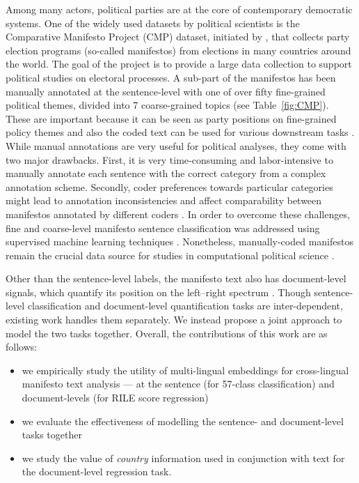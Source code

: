 \documentclass[11pt,a4paper]{article}
\newcommand{\tabref}[2][]{Table#1~\ref{#2}\xspace}
\begin{document}
Among many actors, political parties are at the core of contemporary democratic systems. One of the widely used datasets by political scientists is the Comparative
Manifesto Project (CMP) dataset, initiated by , that collects party election programs (so-called manifestos) from elections in many countries around the world. The goal of the project is to provide a large data collection to support political studies on electoral processes. A sub-part of the manifestos has been manually annotated at the sentence-level with one of over fifty fine-grained political themes, divided into 7 coarse-grained topics (see \tabref{fig:CMP}). These are important because it can be seen as party positions on fine-grained policy themes and also the coded text can be used for various downstream tasks \cite{lowe2011scaling}. While manual annotations are very useful for political analyses, they come with two major drawbacks. First, it is very time-consuming and labor-intensive to manually annotate each sentence with the correct category from a complex annotation scheme. Secondly, coder preferences towards particular categories might lead to annotation inconsistencies and affect comparability between manifestos annotated by different coders \cite{coder}. In order to overcome these challenges, fine and coarse-level manifesto sentence classification was addressed using supervised machine learning techniques \cite{verberne2014automatic, zirn2016classifying}. Nonetheless, manually-coded manifestos remain the crucial data source for studies in computational political science \cite{lowe2011scaling, nanni}. 


Other than the sentence-level labels, the manifesto text also has document-level signals,
which quantify its position on the left--right spectrum \cite{slapin2008scaling}. Though sentence-level classification and document-level quantification tasks are inter-dependent, existing work handles them separately.  We instead propose a joint approach to model the two tasks together. Overall, the contributions of this work are as follows:
\begin{itemize}
\item we empirically study the utility of multi-lingual embeddings for cross-lingual manifesto text analysis --- at the sentence (for 57-class classification) and document-levels (for RILE score regression)

\item we evaluate the effectiveness of modelling the sentence- and document-level tasks together

\item we study the value of \textit{country} information used in conjunction with text for the document-level regression task.
\end{itemize}
\end{document}
